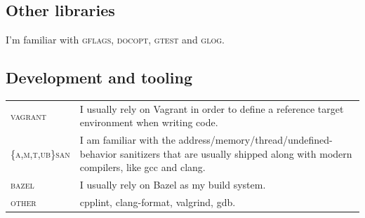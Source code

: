 \documentclass[10PT,letter]{article}
\newcommand{\subsectionstyle}[1]{\normalfont\selectfont\textcolor{titlecol}{\sffamily #1}}
\begin{document}
        \subsection*{\subsectionstyle{Other libraries}}
            I'm familiar with \textsc{gflags}, \textsc{docopt}, \textsc{gtest} and \textsc{glog}.

        \subsection*{\subsectionstyle{Development and tooling}}
            \begin{tabular}{p{1in}p{5.55in}}
                \textsc{vagrant} & I usually rely on Vagrant in order to define a reference target environment when writing code.\\[.5mm]
                \textsc{\{a,m,t,ub\}san} & I am familiar with the address/memory/thread/undefined-behavior sanitizers that are usually shipped along with modern compilers, like gcc and clang.\\[.5mm]
                \textsc{bazel} & I usually rely on Bazel as my build system.\\[.5mm]
                \textsc{other} & cpplint, clang-format, valgrind, gdb.
            \end{tabular}
\end{document}
